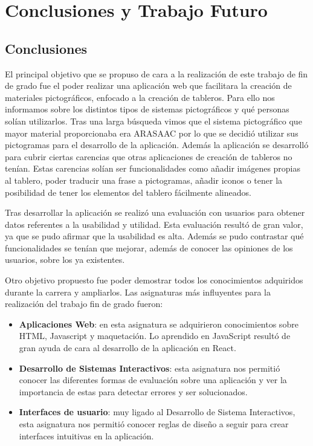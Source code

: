 \chapter{Conclusiones y Trabajo Futuro}
\label{cap:conclusiones}

\section{Conclusiones}
\label{cap7:sec:conclusiones}

El principal objetivo que se propuso de cara a la realización de este trabajo de fin de grado fue el poder realizar una aplicación web que facilitara la creación de materiales pictográficos, enfocado a la creación de tableros. Para ello nos informamos sobre los distintos tipos de sistemas pictográficos y qué personas solían utilizarlos. Tras una larga búsqueda vimos que el sistema pictográfico que mayor material proporcionaba era ARASAAC por lo que se decidió utilizar sus pictogramas para el desarrollo de la aplicación. Además la aplicación se desarrolló para cubrir ciertas carencias que otras aplicaciones de creación de tableros no tenían. Estas carencias solían ser funcionalidades como añadir imágenes propias al tablero, poder traducir una frase a pictogramas, añadir iconos o tener la posibilidad de tener los elementos del tablero fácilmente alineados. 

Tras desarrollar la aplicación se realizó una evaluación con usuarios para obtener datos referentes a la usabilidad y utilidad. Esta evaluación resultó de gran valor, ya que se pudo afirmar que la usabilidad es alta. Además se pudo contrastar qué funcionalidades se tenían que mejorar, además de conocer las opiniones de los usuarios, sobre los ya existentes.


Otro objetivo propuesto fue poder demostrar todos los conocimientos adquiridos durante la carrera y ampliarlos. Las asignaturas más influyentes para la realización del trabajo fin de grado fueron:

\begin{itemize}
	\item \textbf{Aplicaciones Web}: en esta asignatura se adquirieron conocimientos sobre HTML, Javascript y maquetación. Lo aprendido en JavaScript resultó de gran ayuda de cara al desarrollo de la aplicación en React. 
	
	\item\textbf{ Desarrollo de Sistemas Interactivos}: esta asignatura nos permitió conocer las diferentes formas de evaluación sobre una aplicación y ver la importancia de estas para detectar errores y ser solucionados.
	
	\item \textbf{Interfaces de usuario}: muy ligado al Desarrollo de Sistema Interactivos, esta asignatura nos permitió conocer reglas de diseño a seguir para crear interfaces intuitivas en la aplicación.
	
\end{itemize}


